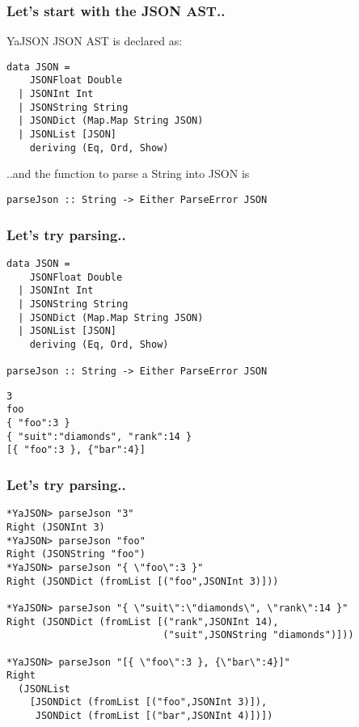 \documentclass{beamer}
\begin{document}
\begin{frame}[fragile]
\frametitle{Let's start with the JSON AST..}

YaJSON JSON AST is declared as:

\begin{verbatim}
data JSON =
    JSONFloat Double
  | JSONInt Int
  | JSONString String
  | JSONDict (Map.Map String JSON)
  | JSONList [JSON]
    deriving (Eq, Ord, Show)
\end{verbatim}

..and the function to parse a String into JSON is

\begin{verbatim}
parseJson :: String -> Either ParseError JSON
\end{verbatim}
\end{frame}

\begin{frame}[fragile]
\frametitle{Let's try parsing..}

{\small
\begin{verbatim}
data JSON =
    JSONFloat Double
  | JSONInt Int
  | JSONString String
  | JSONDict (Map.Map String JSON)
  | JSONList [JSON]
    deriving (Eq, Ord, Show)

parseJson :: String -> Either ParseError JSON
\end{verbatim}
}

\begin{verbatim}
3
foo
{ "foo":3 }
{ "suit":"diamonds", "rank":14 }
[{ "foo":3 }, {"bar":4}]
\end{verbatim}

\end{frame}


\begin{frame}[fragile]
\frametitle{Let's try parsing..}

{\small
\begin{verbatim}
*YaJSON> parseJson "3"
Right (JSONInt 3)
*YaJSON> parseJson "foo"
Right (JSONString "foo")
*YaJSON> parseJson "{ \"foo\":3 }"
Right (JSONDict (fromList [("foo",JSONInt 3)]))

*YaJSON> parseJson "{ \"suit\":\"diamonds\", \"rank\":14 }"
Right (JSONDict (fromList [("rank",JSONInt 14),
                           ("suit",JSONString "diamonds")]))

*YaJSON> parseJson "[{ \"foo\":3 }, {\"bar\":4}]"
Right
  (JSONList
    [JSONDict (fromList [("foo",JSONInt 3)]),
     JSONDict (fromList [("bar",JSONInt 4)])])
\end{verbatim}
}

\end{frame}


\end{document}
